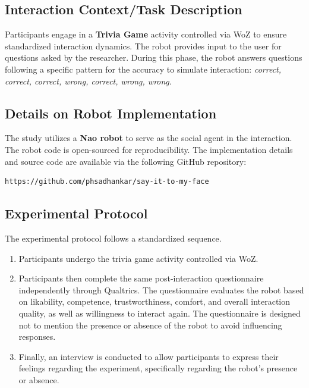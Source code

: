 \documentclass[sigconf,nonacm]{acmart}
\begin{document}
\subsection{Interaction Context/Task Description}
Participants engage in a \textbf{Trivia Game} activity controlled via WoZ to ensure standardized interaction dynamics. The robot provides input to the user for questions asked by the researcher. During this phase, the robot answers questions following a specific pattern for the accuracy to simulate interaction: \textit{correct, correct, correct, wrong, correct, wrong, wrong}.

\subsection{Details on Robot Implementation}
The study utilizes a \textbf{Nao robot} to serve as the social agent in the interaction. The robot code is open-sourced for reproducibility. The implementation details and source code are available via the following GitHub repository:
\begin{verbatim}
https://github.com/phsadhankar/say-it-to-my-face
\end{verbatim}

\subsection{Experimental Protocol}
The experimental protocol follows a standardized sequence.
\begin{enumerate}
    \item Participants undergo the trivia game activity controlled via WoZ.
    \item Participants then complete the same post-interaction questionnaire independently through Qualtrics. The questionnaire evaluates the robot based on likability, competence, trustworthiness, comfort, and overall interaction quality, as well as willingness to interact again.
    \subitem The questionnaire is designed not to mention the presence or absence of the robot to avoid influencing responses.
    \item Finally, an interview is conducted to allow participants to express their feelings regarding the experiment, specifically regarding the robot's presence or absence.
\end{enumerate}
\end{document}
